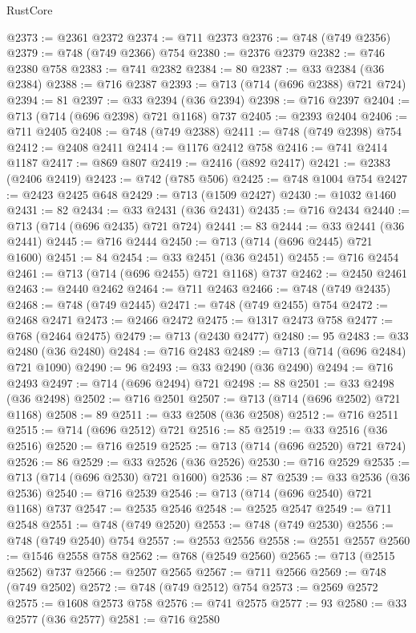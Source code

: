 \begin{lexlean}{RustCore}
\begin{coremodule}
@2373 := @2361 @2372
@2374 := @711 @2373
@2376 := @748 (@749 @2356)
@2379 := @748 (@749 @2366) @754
@2380 := @2376 @2379
@2382 := @746 @2380 @758
@2383 := @741 @2382
@2384 := 80
@2387 := @33 @2384 (@36 @2384)
@2388 := @716 @2387
@2393 := @713 (@714 (@696 @2388) @721 @724)
@2394 := 81
@2397 := @33 @2394 (@36 @2394)
@2398 := @716 @2397
@2404 := @713 (@714 (@696 @2398) @721 @1168) @737
@2405 := @2393 @2404
@2406 := @711 @2405
@2408 := @748 (@749 @2388)
@2411 := @748 (@749 @2398) @754
@2412 := @2408 @2411
@2414 := @1176 @2412 @758
@2416 := @741 @2414 @1187
@2417 := @869 @807
@2419 := @2416 (@892 @2417)
@2421 := @2383 (@2406 @2419)
@2423 := @742 (@785 @506)
@2425 := @748 @1004 @754
@2427 := @2423 @2425 @648
@2429 := @713 (@1509 @2427)
@2430 := @1032 @1460
@2431 := 82
@2434 := @33 @2431 (@36 @2431)
@2435 := @716 @2434
@2440 := @713 (@714 (@696 @2435) @721 @724)
@2441 := 83
@2444 := @33 @2441 (@36 @2441)
@2445 := @716 @2444
@2450 := @713 (@714 (@696 @2445) @721 @1600)
@2451 := 84
@2454 := @33 @2451 (@36 @2451)
@2455 := @716 @2454
@2461 := @713 (@714 (@696 @2455) @721 @1168) @737
@2462 := @2450 @2461
@2463 := @2440 @2462
@2464 := @711 @2463
@2466 := @748 (@749 @2435)
@2468 := @748 (@749 @2445)
@2471 := @748 (@749 @2455) @754
@2472 := @2468 @2471
@2473 := @2466 @2472
@2475 := @1317 @2473 @758
@2477 := @768 (@2464 @2475)
@2479 := @713 (@2430 @2477)
@2480 := 95
@2483 := @33 @2480 (@36 @2480)
@2484 := @716 @2483
@2489 := @713 (@714 (@696 @2484) @721 @1090)
@2490 := 96
@2493 := @33 @2490 (@36 @2490)
@2494 := @716 @2493
@2497 := @714 (@696 @2494) @721
@2498 := 88
@2501 := @33 @2498 (@36 @2498)
@2502 := @716 @2501
@2507 := @713 (@714 (@696 @2502) @721 @1168)
@2508 := 89
@2511 := @33 @2508 (@36 @2508)
@2512 := @716 @2511
@2515 := @714 (@696 @2512) @721
@2516 := 85
@2519 := @33 @2516 (@36 @2516)
@2520 := @716 @2519
@2525 := @713 (@714 (@696 @2520) @721 @724)
@2526 := 86
@2529 := @33 @2526 (@36 @2526)
@2530 := @716 @2529
@2535 := @713 (@714 (@696 @2530) @721 @1600)
@2536 := 87
@2539 := @33 @2536 (@36 @2536)
@2540 := @716 @2539
@2546 := @713 (@714 (@696 @2540) @721 @1168) @737
@2547 := @2535 @2546
@2548 := @2525 @2547
@2549 := @711 @2548
@2551 := @748 (@749 @2520)
@2553 := @748 (@749 @2530)
@2556 := @748 (@749 @2540) @754
@2557 := @2553 @2556
@2558 := @2551 @2557
@2560 := @1546 @2558 @758
@2562 := @768 (@2549 @2560)
@2565 := @713 (@2515 @2562) @737
@2566 := @2507 @2565
@2567 := @711 @2566
@2569 := @748 (@749 @2502)
@2572 := @748 (@749 @2512) @754
@2573 := @2569 @2572
@2575 := @1608 @2573 @758
@2576 := @741 @2575
@2577 := 93
@2580 := @33 @2577 (@36 @2577)
@2581 := @716 @2580

\end{coremodule}
\end{lexlean}
